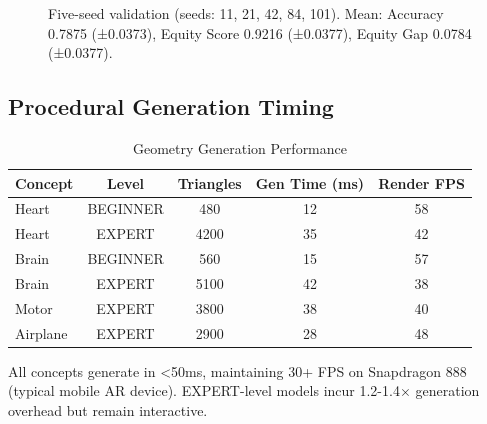 \documentclass[conference]{IEEEtran}
\begin{document}
\begin{figure}[t]
\centering
{}
\caption{Five-seed validation (seeds: 11, 21, 42, 84, 101). Mean: Accuracy 0.7875 (±0.0373), Equity Score 0.9216 (±0.0377), Equity Gap 0.0784 (±0.0377).}
\label{fig:fiveseed}
\end{figure}

\subsection{Procedural Generation Timing}

\begin{table}[h]
\centering
\caption{Geometry Generation Performance}
\label{tab:generation_timing}
\begin{tabular}{lcccc}
\toprule
\textbf{Concept} & \textbf{Level} & \textbf{Triangles} & \textbf{Gen Time (ms)} & \textbf{Render FPS} \\
\midrule
Heart & BEGINNER & 480 & 12 & 58 \\
Heart & EXPERT & 4200 & 35 & 42 \\
Brain & BEGINNER & 560 & 15 & 57 \\
Brain & EXPERT & 5100 & 42 & 38 \\
Motor & EXPERT & 3800 & 38 & 40 \\
Airplane & EXPERT & 2900 & 28 & 48 \\
\bottomrule
\end{tabular}
\end{table}

All concepts generate in <50ms, maintaining 30+ FPS on Snapdragon 888 (typical mobile AR device). EXPERT-level models incur 1.2-1.4$\times$ generation overhead but remain interactive.
\end{document}
